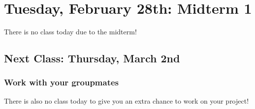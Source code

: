 \section{Tuesday, February 28th: Midterm 1}
There is no class today due to the midterm!

\subsection{Next Class: Thursday, March 2nd}
\subsubsection{Work with your groupmates}
There is also no class today to give you an extra chance to work on your project!
